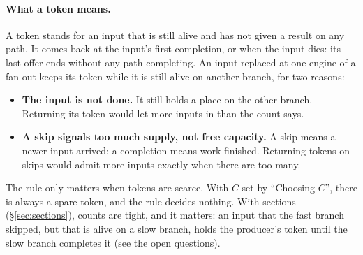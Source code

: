 \documentclass[11pt]{article}
\begin{document}
\paragraph{What a token means.} A token stands for an input that is still
alive and has not given a result on any path. It comes back at the input's
first completion, or when the input dies: its last offer ends without any
path completing. An input replaced at one engine of a fan-out keeps its token
while it is still alive on another branch, for two reasons:
\begin{itemize}[nosep]
  \item \textbf{The input is not done.} It still holds a place on the other
        branch. Returning its token would let more inputs in than the count
        says.
  \item \textbf{A skip signals too much supply, not free capacity.} A skip
        means a newer input arrived; a completion means work finished.
        Returning tokens on skips would admit more inputs exactly when there
        are too many.
\end{itemize}
The rule only matters when tokens are scarce. With $C$ set by ``Choosing
$C$'', there is always a spare token, and the rule decides nothing. With
sections (\S\ref{sec:sections}), counts are tight, and it matters: an input
that the fast branch skipped, but that is alive on a slow branch, holds the producer's
token until the slow branch completes it (see the open questions).
\end{document}

